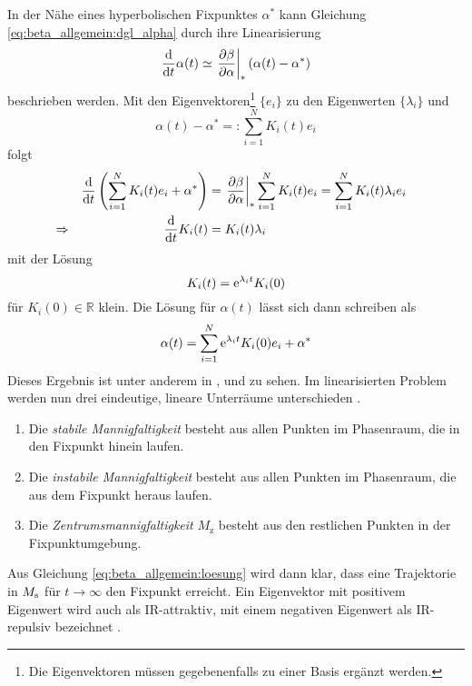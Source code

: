     In der Nähe eines hyperbolischen Fixpunktes $\alpha^*$ kann Gleichung 
    \eqref{eq:beta_allgemein:dgl_alpha} durch ihre Linearisierung
    \begin{equation}
     \frac{\text{d}}{\text{d} t} \alpha(t) \simeq \left.\frac{\partial \beta}{\partial \alpha}\right|_* (\alpha(t)-\alpha^*) \label{eq:beta_allgemein:beta_linear}
    \end{equation}
     beschrieben werden. Mit den Eigenvektoren\footnote{Die Eigenvektoren 
     müssen gegebenenfalls zu einer Basis ergänzt werden.} $\{e_i\}$ zu den Eigenwerten 
     $\{\lambda_i\}$ und 
     \begin{equation}
      \alpha(t)-\alpha^*=:\sum_{i=1}^N K_i(t) e_i
     \end{equation}
     folgt  
    \begin{align}
     &&\frac{\text{d}}{\text{d} t} \left(\sum\limits_{i=1}^N K_i(t)e_i + \alpha^* \right) &=
     \left.\frac{\partial \beta}{\partial \alpha}\right|_* \sum\limits_{i=1}^N K_i(t) e_i = \sum\limits_{i=1}^N K_i(t) \lambda_i e_i &\\
     &\Rightarrow&  \frac{\text{d}}{\text{d} t} K_i(t) &= K_i(t) \lambda_i &
    \end{align}
    mit der Lösung
    \begin{equation}
     K_i(t)=\text{e}^{\lambda_i t} K_i(0) \label{eq:beta_allgemein:K}
    \end{equation}
    für $K_i(0) \in \mathbb{R}$ klein. Die Lösung für $\alpha(t)$ lässt sich dann schreiben als 
    \begin{equation}
     \alpha(t)=\sum\limits_{i=1}^N \text{e}^{\lambda_i t} K_i(0) e_i +\alpha^* \label{eq:beta_allgemein:loesung}
    \end{equation}
    Dieses Ergebnis ist unter anderem in \cite{Weinberg:1976}, \cite{General_relativity} und 
    \cite{Asymptotic_safety_guaranteed} zu sehen.
    Im linearisierten Problem werden nun drei eindeutige, lineare Unterräume unterschieden 
    \cite{Bronstein}.
    \begin{definition}
     \begin{enumerate}
      \item Die \textit{stabile Mannigfaltigkeit} besteht aus allen Punkten im Phasenraum, 
      die in den Fixpunkt hinein laufen.
      \item Die \textit{instabile Mannigfaltigkeit} besteht aus allen Punkten im Phasenraum, 
      die aus dem Fixpunkt heraus laufen.
      \item Die \textit{Zentrumsmannigfaltigkeit} $M_\text{z}$ besteht aus den restlichen 
      Punkten in der Fix\-punkt\-um\-ge\-bung.
      \end{enumerate}
    \end{definition}
    Aus Gleichung \eqref{eq:beta_allgemein:loesung} wird dann klar, dass eine Trajektorie in 
    $M_\text{s}$ für $t\to\infty$ den Fixpunkt erreicht. Ein Eigenvektor mit positivem 
    Eigenwert wird auch als IR-attraktiv, mit einem negativen Eigenwert als IR-repulsiv 
    bezeichnet \cite{Weinberg:1976}. 

